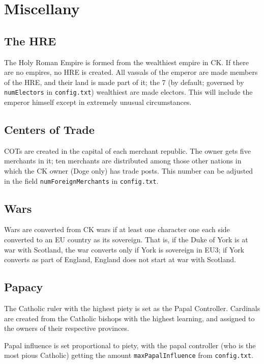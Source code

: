 \documentclass[12pt,ebook,oneside]{book}
\begin{document}
\chapter{Miscellany}

\section{The HRE}

The Holy Roman Empire is formed from the wealthiest empire in CK. If
there are no empires, no HRE is created. All vassals of the emperor
are made members of the HRE, and their land is made part of it; the 7
(by default; governed by \verb|numElectors| in \verb|config.txt|)
wealthiest are made electors. This will include the emperor himself
except in extremely unusual circumstances. 

\section{Centers of Trade}

COTs are created in the capital of each merchant republic. The owner
gets five merchants in it; ten merchants are distributed among those
other nations in which the CK owner (Doge only) has trade posts. This
number can be adjusted in the field \verb|numForeignMerchants| in
\verb|config.txt|. 

\section{Wars}

Wars are converted from CK wars if at least one character one each
side converted to an EU country as its sovereign. That is, if the Duke
of York is at war with Scotland, the war converts only if York is
sovereign in EU3; if York converts as part of England, England does
not start at war with Scotland. 

\section{Papacy}

The Catholic ruler with the highest piety is set as the Papal
Controller. Cardinals are created from the Catholic bishops with the
highest learning, and assigned to the owners of their respective
provinces. 

Papal influence is set proportional to piety, with the papal
controller (who is the most pious Catholic) getting the amount
\verb|maxPapalInfluence| from \verb|config.txt|. 
\end{document}
